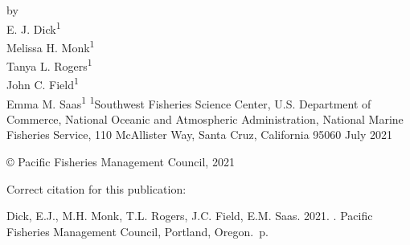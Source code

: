 \documentclass[11pt,
  english,
  a4paper,
]{article}
\date{}
\newcommand{\trTitle}{}
\newcommand{\trYear}{2021}
\newcommand{\trMonth}{July}
\newcommand{\trAuthsBack}{Dick, E.J., M.H. Monk, T.L. Rogers, J.C. Field, E.M. Saas}
\newcommand{\trCitation}{
\begin{hangparas}{1em}{1}
\trAuthsBack{}. \trYear{}. \trTitle{}. Pacific Fisheries Management Council, Portland, Oregon. \pageref{LastPage}{}\,p.
\end{hangparas}}
\begin{document}

\renewcommand*{\thefootnote}{\fnsymbol{footnote}}

\small
\thispagestyle{empty}
\noindent
\begin{center}
\title{}
\vspace{1.5cm}
{\Large\textbf\newline{}}
\vfill
by\\
E. J. Dick\textsuperscript{1}\\
Melissa H. Monk\textsuperscript{1}\\
Tanya L. Rogers\textsuperscript{1}\\
John C. Field\textsuperscript{1}\\
Emma M. Saas\textsuperscript{1}\vfill
\textsuperscript{1}Southwest Fisheries Science Center, U.S. Department of Commerce, National Oceanic and Atmospheric Administration, National Marine Fisheries Service, 110 McAllister Way, Santa Cruz, California 95060\vfill
\trMonth{} \trYear{}
\end{center}
\clearpage

\thispagestyle{empty}
\vspace*{\fill}
\begin{center}
\copyright{} Pacific Fisheries Management Council, \trYear{}\\
\end{center}
\par
\bigskip
\noindent
Correct citation for this publication:
\bigskip
\par
\trCitation{}
\clearpage


\tableofcontents\clearpage
\label{TRlastRoman}
\clearpage

\newpage
\thispagestyle{empty} %

\pagestyle{plain}  %
\renewcommand*{\thefootnote}{\arabic{footnote}}  %
\setcounter{footnote}{0}  %
\renewcommand{\headrulewidth}{0.5pt}
\renewcommand{\footrulewidth}{0.5pt}
\end{document}

